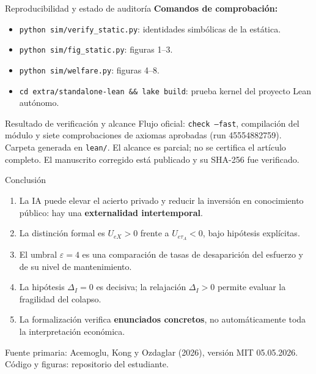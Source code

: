 \documentclass[aspectratio=169,10pt]{beamer}
\newcommand{\shortref}[1]{{\footnotesize\color{muted}#1}}
\begin{document}
\begin{frame}{Reproducibilidad y estado de auditoría}
\textbf{Comandos de comprobación:}
\begin{itemize}
\item \texttt{python sim/verify\_static.py}: identidades simbólicas de la estática.
\item \texttt{python sim/fig\_static.py}: figuras 1--3.
\item \texttt{python sim/welfare.py}: figuras 4--8.
\item \texttt{cd extra/standalone-lean \&\& lake build}: prueba kernel del proyecto Lean autónomo.
\end{itemize}
\begin{block}{Resultado de verificación y alcance}
Flujo oficial: \texttt{check --fast}, compilación del módulo y siete comprobaciones de axiomas aprobadas (run 45554882759). Carpeta generada en \texttt{lean/}. El alcance es parcial; no se certifica el artículo completo. El manuscrito corregido está publicado y su SHA-256 fue verificado.
\end{block}
\end{frame}

\begin{frame}{Conclusión}
\begin{enumerate}
\item La IA puede elevar el acierto privado y reducir la inversión en conocimiento público: hay una \textbf{externalidad intertemporal}.
\item La distinción formal es $U_{eX}>0$ frente a $U_{e\tau_A}<0$, bajo hipótesis explícitas.
\item El umbral $\varepsilon=4$ es una comparación de tasas de desaparición del esfuerzo y de su nivel de mantenimiento.
\item La hipótesis $\Delta_I=0$ es decisiva; la relajación $\Delta_I>0$ permite evaluar la fragilidad del colapso.
\item La formalización verifica \textbf{enunciados concretos}, no automáticamente toda la interpretación económica.
\end{enumerate}
\vspace{0.4em}
\shortref{Fuente primaria: Acemoglu, Kong y Ozdaglar (2026), versión MIT 05.05.2026. Código y figuras: repositorio del estudiante.}
\end{frame}
\end{document}
